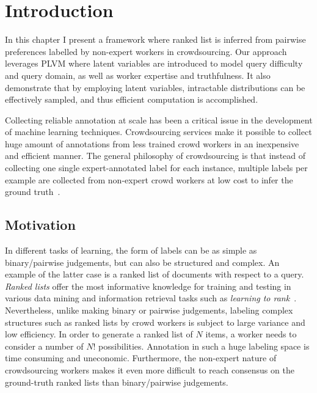 \section{Introduction}

In this chapter I present a framework where ranked list is inferred from
pairwise preferences labelled by non-expert workers in crowdsourcing. Our
approach leverages PLVM where latent variables are introduced to model query
difficulty and query domain, as well as worker expertise and truthfulness. It
also demonstrate that by employing latent variables, intractable distributions
can be effectively sampled, and thus efficient computation is accomplished.


Collecting reliable annotation at scale has been a critical issue in the
development of machine learning techniques. Crowdsourcing services make it
possible to collect huge amount of annotations from less trained crowd workers
in an inexpensive and efficient manner. The general philosophy of crowdsourcing
is that instead of collecting one single expert-annotated label for each
instance, multiple labels per example are collected from non-expert crowd
workers at low cost to infer the ground
truth~\cite{welinder2010multidimensional,whitehill2009whose}.

\subsection{Motivation}

In different tasks of learning, the form of labels can
be as simple as binary/pairwise judgements, but can also be structured and
complex.  An example of the latter case is a ranked list of documents with
respect to a query. \emph{Ranked lists} offer the most informative knowledge for
training and testing in various data mining and information retrieval tasks such
as \emph{learning to rank}~\cite{valizadegan2009learning,yue2007support}.
Nevertheless, unlike making binary or pairwise judgements, labeling complex
structures such as ranked lists by crowd workers is subject to large variance
and low efficiency. In order to generate a ranked list of $N$ items, a worker
needs to consider a number of $N!$ possibilities. Annotation in such a huge
labeling space is time consuming and uneconomic. Furthermore, the non-expert
nature of crowdsourcing workers makes it even more difficult to reach  consensus
on the ground-truth ranked lists than binary/pairwise judgements.

